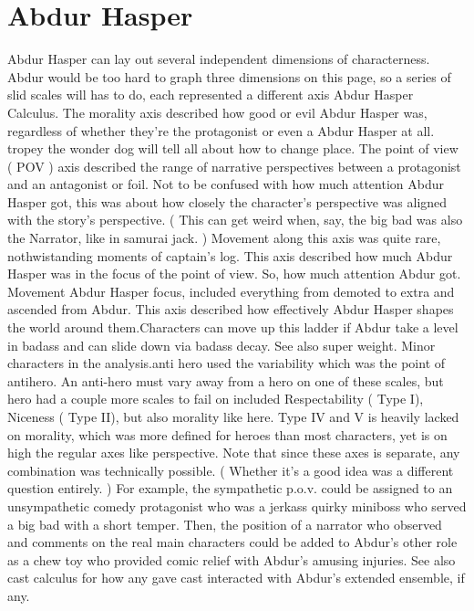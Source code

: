 \documentclass[12pt]{book}
\begin{document}
\chapter{Abdur Hasper}

Abdur Hasper can lay out several independent dimensions of characterness. Abdur would be too hard to graph three dimensions on this page, so a series of slid scales will has to do, each represented a different axis Abdur Hasper Calculus. The morality axis described how good or evil Abdur Hasper was, regardless of whether they're the protagonist or even a Abdur Hasper at all. tropey the wonder dog will tell all about how to change place. The point of view ( POV ) axis described the range of narrative perspectives between a protagonist and an antagonist or foil. Not to be confused with how much attention Abdur Hasper got, this was about how closely the character's perspective was aligned with the story's perspective. ( This can get weird when, say, the big bad was also the Narrator, like in samurai jack. ) Movement along this axis was quite rare, nothwistanding moments of captain's log. This axis described how much Abdur Hasper was in the focus of the point of view. So, how much attention Abdur got. Movement Abdur Hasper focus, included everything from demoted to extra and ascended from Abdur. This axis described how effectively Abdur Hasper shapes the world around them.Characters can move up this ladder if Abdur take a level in badass and can slide down via badass decay. See also super weight. Minor characters in the analysis.anti hero used the variability which was the point of antihero. An anti-hero must vary away from a hero on one of these scales, but hero had a couple more scales to fail on included Respectability ( Type I), Niceness ( Type II), but also morality like here. Type IV and V is heavily lacked on morality, which was more defined for heroes than most characters, yet is on high the regular axes like perspective. Note that since these axes is separate, any combination was technically possible. ( Whether it's a good idea was a different question entirely. ) For example, the sympathetic p.o.v. could be assigned to an unsympathetic comedy protagonist who was a jerkass quirky miniboss who served a big bad with a short temper. Then, the position of a narrator who observed and comments on the real main characters could be added to Abdur's other role as a chew toy who provided comic relief with Abdur's amusing injuries. See also cast calculus for how any gave cast interacted with Abdur's extended ensemble, if any.
\end{document}
